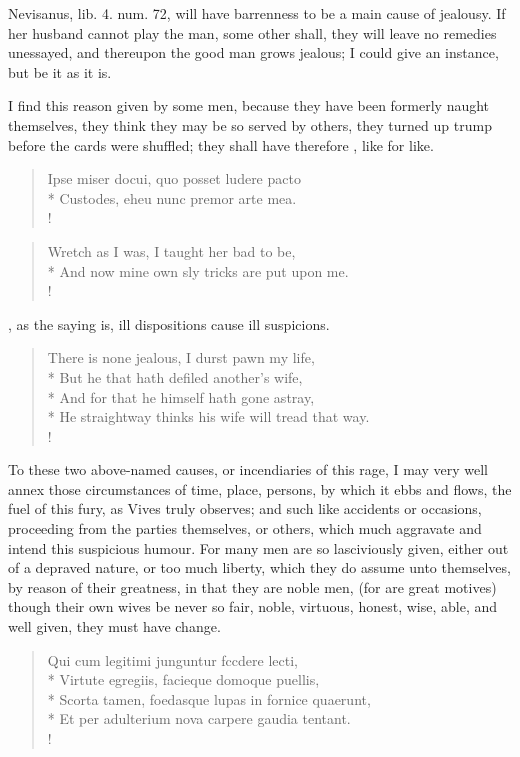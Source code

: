 Nevisanus, lib. 4. num. 72, will have barrenness to be a main
cause of jealousy. If her husband cannot play the man, some other
shall, they will leave no remedies unessayed, and thereupon the good
man grows jealous; I could give an instance, but be it as it is.

I find this reason given by some men, because they have been formerly
naught themselves, they think they may be so served by others, they
turned up trump before the cards were shuffled; they shall have
therefore , like for like.
%
\begin{latin}%
\begin{verse}%
Ipse miser docui, quo posset ludere pacto\\*
Custodes, eheu nunc premor arte mea.\\!
\end{verse}%
\end{latin}%
\translationrule%
\begin{verse}%
Wretch as I was, I taught her bad to be,\\*
And now mine own sly tricks are put upon me.\\!
\end{verse}%
%
%
, as the saying is, ill dispositions cause ill
suspicions.
%
\begin{verse}%
There is none jealous, I durst pawn my life,\\*
But he that hath defiled another's wife,\\*
And for that he himself hath gone astray,\\*
He straightway thinks his wife will tread that way.\\!
\end{verse}%
%

To these two above-named causes, or incendiaries of this rage, I may
very well annex those circumstances of time, place, persons, by which
it ebbs and flows, the fuel of this fury, as Vives truly
observes; and such like accidents or occasions, proceeding from the
parties themselves, or others, which much aggravate and intend this
suspicious humour. For many men are so lasciviously given, either out
of a depraved nature, or too much liberty, which they do assume unto
themselves, by reason of their greatness, in that they are noble men,
(for  are great motives)
though their own wives be never so fair, noble, virtuous, honest, wise,
able, and well given, they must have change.
%
\begin{latin}%
\begin{verse}%
Qui cum legitimi junguntur fccdere lecti,\\*
Virtute egregiis, facieque domoque puellis,\\*
Scorta tamen, foedasque lupas in fornice quaerunt,\\*
Et per adulterium nova carpere gaudia tentant.\\!
\end{verse}%
\end{latin}%

